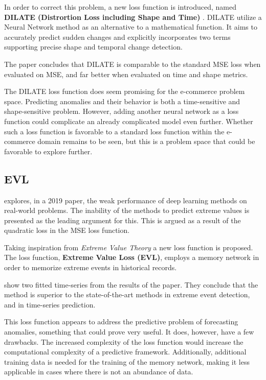 In order to correct this problem, a new loss function is introduced, named
\textbf{DILATE (Distrortion Loss including Shape and Time)} \cite{Guen2019}.
DILATE utilize a Neural Network method as an alternative to a mathematical function.
It aims to accurately predict sudden changes and explicitly incorporates two terms
supporting precise shape and temporal change detection.

The paper concludes that DILATE is comparable to the standard MSE loss when evaluated on MSE,
and far better when evaluated on time and shape metrics.

The DILATE loss function does seem promising for the e-commerce problem space.
Predicting anomalies and their behavior is both a time-sensitive and shape-sensitive problem.
However, adding another neural network as a loss function could complicate an already complicated model even further.
Whether such a loss function is favorable to a standard loss function within the e-commerce domain remains to be seen,
but this is a problem space that could be favorable to explore further.

\subsection{EVL}
\citeauthor{Ding2019} explores, in a 2019 paper, the weak performance of deep learning methods on real-world problems.
The inability of the methods to predict extreme values is presented as the leading argument for this.
This is argued as a result of the quadratic loss in the MSE loss function.

Taking inspiration from \textit{Extreme Value Theory} a new loss function is proposed.
The loss function, \textbf{Extreme Value Loss (EVL)},
employs a memory network in order to memorize extreme events in historical records.

 show two fitted time-series from the results of the paper. They conclude
that the method is superior to the state-of-the-art methods in extreme event detection, and
in time-series prediction.

This loss function appears to address the predictive problem of forecasting anomalies,
something that could prove very useful.
It does, however, have a few drawbacks.
The increased complexity of the loss function would increase the computational complexity of a predictive framework.
Additionally, additional training data is needed for the training of the memory network,
making it less applicable in cases where there is not an abundance of data.

